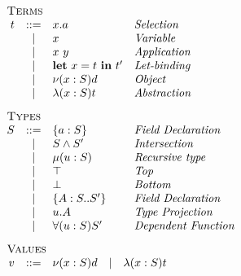 \begin{minipage}[t]{.5\textwidth}\[\begin{array}{r c l l}
    \multicolumn{4}{l}{\textsc{Terms}}                        \\
    t & ::= & x.a             & \textit{Selection           } \\
      &  |  & x               & \textit{Variable            } \\
      &  |  & x\ y            & \textit{Application         } \\
      &  |  & \LET{x}{t}{t'}  & \textit{Let-binding         } \\
      &  |  & \OBJ{x}{S}{d}   & \textit{Object              } \\
      &  |  & \ABS{x}{S}{t}   & \textit{Abstraction         } \\[3mm]
    \multicolumn{4}{l}{\textsc{Types}}                        \\
    S & ::= & \FDEC{a}{S}     & \textit{Field Declaration   } \\
      &  |  & \AGG{S}{S'}     & \textit{Intersection        } \\
      &  |  & \REC{u}{S}      & \textit{Recursive type      } \\
      &  |  & \top            & \textit{Top                 } \\
      &  |  & \bot            & \textit{Bottom              } \\
      &  |  & \TDEC{A}{S}{S'} & \textit{Field Declaration   } \\
      &  |  & u.A             & \textit{Type Projection     } \\
      &  |  & \DFUN{u}{S}{S'} & \textit{Dependent Function  } \\[3mm]
    \multicolumn{4}{l}{\textsc{Values}} \\
    v & ::= & \multicolumn{2}{l}{\OBJ{x}{S}{d}
        \quad | \quad \ABS{x}{S}{t}} \\[3mm]
\end{array}\]\end{minipage}
